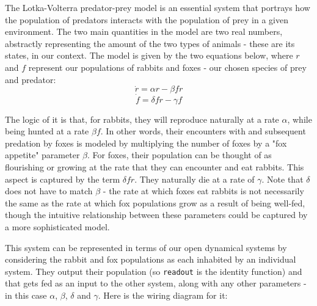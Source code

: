 The Lotka-Volterra predator-prey model is an essential system \cite{Murray2002} that portrays how the population of predators interacts with the population of prey in a given environment. The two main quantities in the model are two real numbers, abstractly representing the amount of the two types of animals - these are its states, in our context. The model is given by the two equations below, where $r$ and $f$ represent our populations of rabbits and foxes - our chosen species of prey and predator:
\begin{equation}
\dot{r} = \alpha r - \beta f r
\label{eq:rabbits}
\end{equation}
\begin{equation}
\dot{f} = \delta f r - \gamma f
\label{eq:foxes}
\end{equation}

The logic of it is that, for rabbits, they will reproduce naturally at a rate $\alpha$, while being hunted at a rate $\beta f$. In other words, their encounters with and subsequent predation by foxes is modeled by multiplying the number of foxes by a "fox appetite" parameter $\beta$. For foxes, their population can be thought of as flourishing or growing at the rate that they can encounter and eat rabbits. This aspect is captured by the term $\delta f r$. They naturally die at a rate of $\gamma$. Note that $\delta$ does not have to match $\beta$ - the rate at which foxes eat rabbits is not necessarily the same as the rate at which fox populations grow as a result of being well-fed, though the intuitive relationship between these parameters could be captured by a more sophisticated model.

This system can be represented in terms of our open dynamical systems by considering the rabbit and fox populations as each inhabited by an individual system. They output their population (so \texttt{readout} is the identity function) and that gets fed as an input to the other system, along with any other parameters - in this case $\alpha$, $\beta$, $\delta$ and $\gamma$. Here is the wiring diagram for it:

